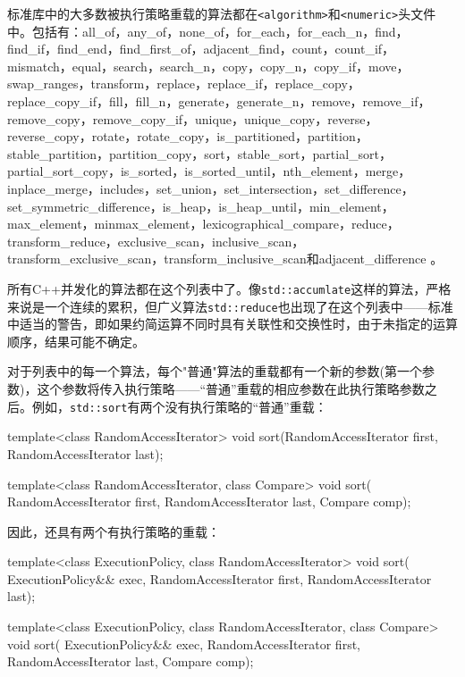 
标准库中的大多数被执行策略重载的算法都在\texttt{<algorithm>}和\texttt{<numeric>}头文件中。包括有：all\_of，any\_of，none\_of，for\_each，for\_each\_n，find，find\_if，find\_end，find\_first\_of，adjacent\_find，count，count\_if，mismatch，equal，search，search\_n，copy，copy\_n，copy\_if，move，swap\_ranges，transform，replace，replace\_if，replace\_copy，replace\_copy\_if，fill，fill\_n，generate，generate\_n，remove，remove\_if，remove\_copy，remove\_copy\_if，unique，unique\_copy，reverse，reverse\_copy，rotate，rotate\_copy，is\_partitioned，partition，stable\_partition，partition\_copy，sort，stable\_sort，partial\_sort，partial\_sort\_copy，is\_sorted，is\_sorted\_until，nth\_element，merge，inplace\_merge，includes，set\_union，set\_intersection，set\_difference，set\_symmetric\_difference，is\_heap，is\_heap\_until，min\_element，max\_element，minmax\_element，lexicographical\_compare，reduce，transform\_reduce，exclusive\_scan，inclusive\_scan，transform\_exclusive\_scan，transform\_inclusive\_scan和adjacent\_difference 。

所有C++并发化的算法都在这个列表中了。像\texttt{std::accumlate}这样的算法，严格来说是一个连续的累积，但广义算法\texttt{std::reduce}也出现了在这个列表中——标准中适当的警告，即如果约简运算不同时具有关联性和交换性时，由于未指定的运算顺序，结果可能不确定。

对于列表中的每一个算法，每个"普通"算法的重载都有一个新的参数(第一个参数)，这个参数将传入执行策略——“普通”重载的相应参数在此执行策略参数之后。例如，\texttt{std::sort}有两个没有执行策略的“普通”重载：

\begin{cpp}
template<class RandomAccessIterator>
void sort(RandomAccessIterator first, RandomAccessIterator last);

template<class RandomAccessIterator, class Compare>
void sort(
  RandomAccessIterator first, RandomAccessIterator last, Compare comp);
\end{cpp}

因此，还具有两个有执行策略的重载：

\begin{cpp}
template<class ExecutionPolicy, class RandomAccessIterator>
void sort(
  ExecutionPolicy&& exec,
  RandomAccessIterator first, RandomAccessIterator last);

template<class ExecutionPolicy, class RandomAccessIterator, class Compare>
void sort(
  ExecutionPolicy&& exec,
  RandomAccessIterator first, RandomAccessIterator last, Compare comp);
\end{cpp}

